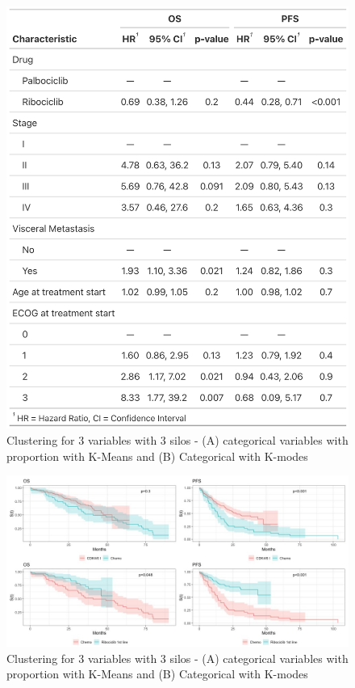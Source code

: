 \begin{figure}[ht]
  \caption{Clustering for 3 variables with 3 silos - (A) categorical variables with  proportion with K-Means and (B)  Categorical with K-modes  }\label{fig:cox} 
  \includegraphics[width=\linewidth]{figures/cox_both.png}%

\end{figure}

\begin{figure}[ht]
  \caption{Clustering for 3 variables with 3 silos - (A) categorical variables with  proportion with K-Means and (B)  Categorical with K-modes  }\label{fig:grouped} 
  \includegraphics[width=\linewidth]{figures/grouped_curve_both.jpeg}%

\end{figure}

